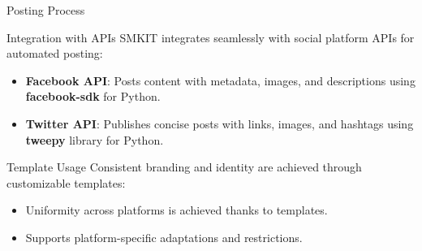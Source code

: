 \documentclass{beamer}
\begin{document}
    \begin{frame}{Posting Process}
        \begin{block}{Integration with APIs}
            SMKIT integrates seamlessly with social platform APIs for automated posting:
            \begin{itemize}
                \item \textbf{Facebook API}: Posts content with metadata, images, and descriptions using \textbf{facebook-sdk} for Python.
                \item \textbf{Twitter API}: Publishes concise posts with links, images, and hashtags using \textbf{tweepy} library  for Python.
            \end{itemize}
        \end{block}
    
        \begin{block}{Template Usage}
            Consistent branding and identity are achieved through customizable templates:
            \begin{itemize}
                \item Uniformity across platforms is achieved thanks to templates.
                \item Supports platform-specific adaptations and restrictions.
            \end{itemize}
        \end{block}
    \end{frame}
\end{document}
